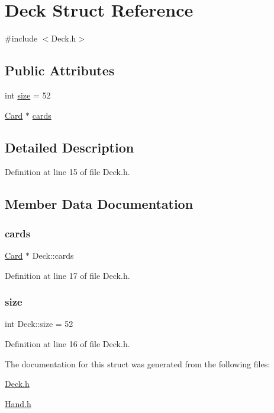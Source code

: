 \hypertarget{struct_deck}{}\section{Deck Struct Reference}
\label{struct_deck}


{\ttfamily \#include $<$Deck.\+h$>$}

\subsection*{Public Attributes}
\begin{DoxyCompactItemize}
\item 
int \mbox{\hyperlink{struct_deck_a8a6e5802d07c4e5181f624fbdd67f71f}{size}} = 52
\item 
\mbox{\hyperlink{struct_card}{Card}} $\ast$ \mbox{\hyperlink{struct_deck_a3261f11ece5a7f756228634d79ed3649}{cards}}
\end{DoxyCompactItemize}


\subsection{Detailed Description}


Definition at line 15 of file Deck.\+h.



\subsection{Member Data Documentation}
\mbox{\label{struct_deck_a3261f11ece5a7f756228634d79ed3649}} 
\subsubsection{\texorpdfstring{cards}{cards}}
{\footnotesize\ttfamily \mbox{\hyperlink{struct_card}{Card}} $\ast$ Deck\+::cards}



Definition at line 17 of file Deck.\+h.

\mbox{\label{struct_deck_a8a6e5802d07c4e5181f624fbdd67f71f}} 
\subsubsection{\texorpdfstring{size}{size}}
{\footnotesize\ttfamily int Deck\+::size = 52}



Definition at line 16 of file Deck.\+h.



The documentation for this struct was generated from the following files\+:\begin{DoxyCompactItemize}
\item 
\mbox{\hyperlink{_deck_8h}{Deck.\+h}}\item 
\mbox{\hyperlink{_hand_8h}{Hand.\+h}}\end{DoxyCompactItemize}
